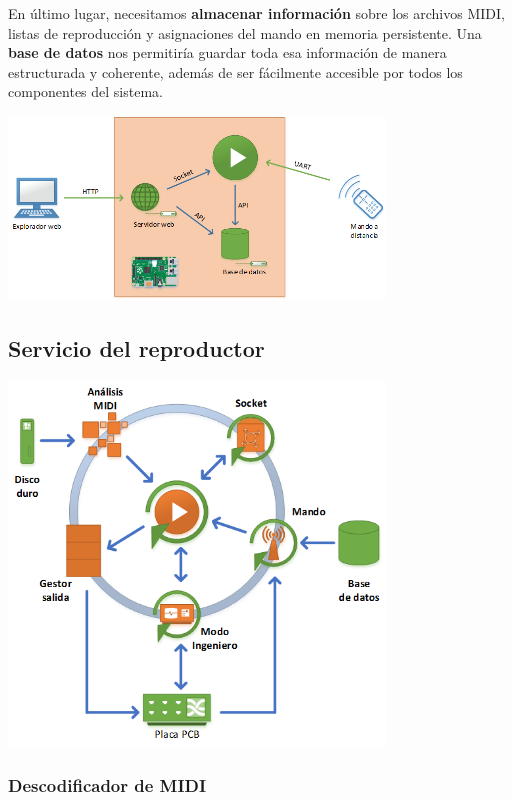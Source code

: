 \documentclass[10pt,a4paper]{article}
\begin{document}
	En último lugar, necesitamos \textbf{almacenar información} sobre los archivos MIDI, listas de reproducción y asignaciones del mando en memoria persistente. Una \textbf{base de datos} nos permitiría guardar toda esa información de manera estructurada y coherente, además de ser fácilmente accesible por todos los componentes del sistema.
		
	\begin{center}
		\includegraphics[width=0.75\textwidth]{images/general}
	\end{center}
	
	\subsection{Servicio del reproductor}
	
	\begin{center}
		\includegraphics[width=0.75\textwidth]{images/reproductor}
	\end{center}
	
	\subsubsection{Descodificador de MIDI}
\end{document}

